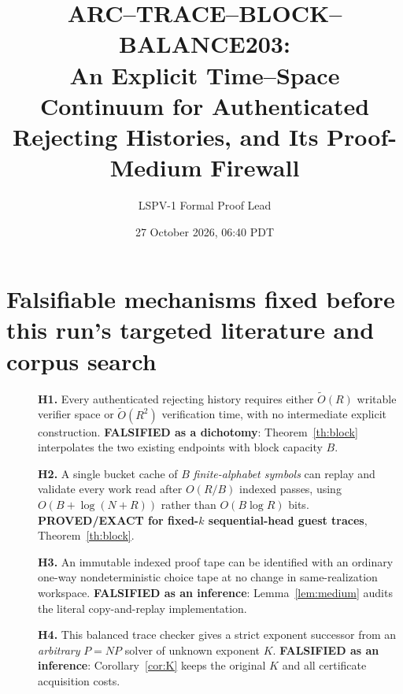 \documentclass[11pt]{article}
\title{ARC--TRACE--BLOCK--BALANCE203:\\An Explicit Time--Space Continuum for Authenticated Rejecting Histories, and Its Proof-Medium Firewall}
\author{LSPV-1 Formal Proof Lead}
\date{27 October 2026, 06:40 PDT}
\begin{document}
\maketitle

\begin{center}
\end{center}

\section{Falsifiable mechanisms fixed before this run's targeted literature and corpus search}
\begin{description}
\item[] \textbf{H1.} Every authenticated rejecting history requires either $\widetilde O(R)$ writable verifier space or $\widetilde O(R^2)$ verification time, with no intermediate explicit construction. \textbf{FALSIFIED as a dichotomy}: Theorem~\ref{th:block} interpolates the two existing endpoints with block capacity $B$.
\item[] \textbf{H2.} A single bucket cache of $B$ \emph{finite-alphabet symbols} can replay and validate every work read after $O(R/B)$ indexed passes, using $O(B+\log(N+R))$ rather than $O(B\log R)$ bits. \textbf{PROVED/EXACT for fixed-$k$ sequential-head guest traces}, Theorem~\ref{th:block}.
\item[] \textbf{H3.} An immutable indexed proof tape can be identified with an ordinary one-way nondeterministic choice tape at no change in same-realization workspace. \textbf{FALSIFIED as an inference}: Lemma~\ref{lem:medium} audits the literal copy-and-replay implementation.
\item[] \textbf{H4.} This balanced trace checker gives a strict exponent successor from an \emph{arbitrary} $P=NP$ solver of unknown exponent $K$. \textbf{FALSIFIED as an inference}: Corollary~\ref{cor:K} keeps the original $K$ and all certificate acquisition costs.
\end{description}
\end{document}
